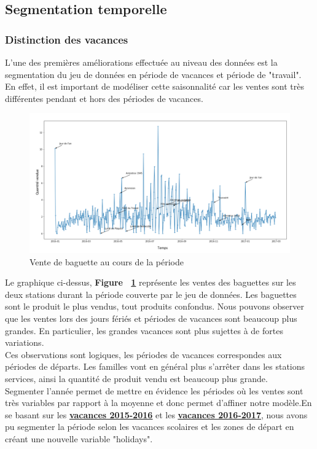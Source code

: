 \documentclass{article} %
\begin{document}
\subsection{Segmentation temporelle}
\subsubsection{Distinction des vacances}
L'une des premières améliorations effectuée au niveau des données est la segmentation du jeu de données en période de vacances et période de "travail". En effet, il est important de modéliser cette saisonnalité car les ventes sont très différentes pendant et hors des périodes de vacances. 
\begin{figure}[!h]
	\centering
	\includegraphics[keepaspectratio = true,scale=0.65]{varvente.png}
	\caption{Vente de baguette au cours de la période}
	\label{bbg}
\end{figure}
Le graphique ci-dessus, \textbf{Figure ~\ref{bbg}} représente les ventes des baguettes sur les deux stations durant la période couverte par le jeu de données. Les baguettes sont le produit le plus vendus, tout produits confondus. Nous pouvons observer que les ventes lors des jours fériés et périodes de vacances sont beaucoup plus grandes. En particulier, les grandes vacances sont plus sujettes à de fortes variations.\\
Ces observations sont logiques, les périodes de vacances correspondes aux périodes de départs. Les familles vont en général plus s'arrêter dans les stations services, ainsi la quantité de produit vendu est beaucoup plus grande.\\
Segmenter l'année permet de mettre en évidence les périodes où les ventes sont très variables par rapport à la moyenne et donc permet d'affiner notre modèle.En se basant sur les \href{https://vacances-scolaires.education/annee-2015-2016.php}{\underline{\textbf{\textcolor[rgb]{0,0,1}{vacances 2015-2016}}}} et les \href{https://vacances-scolaires.education/annee-2016-2017.php}{\underline{\textbf{\textcolor[rgb]{0,0,1}{vacances 2016-2017}}}}, nous avons pu segmenter la période selon les vacances scolaires et les zones de départ en créant une nouvelle variable "holidays".
\end{document}

